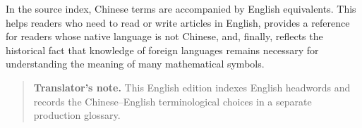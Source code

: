 In the source index, Chinese terms are accompanied by English equivalents. This helps readers who need to read or write articles in English, provides a reference for readers whose native language is not Chinese, and, finally, reflects the historical fact that knowledge of foreign languages remains necessary for understanding the meaning of many mathematical symbols.

\begin{quote}\small
\textbf{Translator's note.} This English edition indexes English headwords and records the Chinese--English terminological choices in a separate production glossary.
\end{quote}
